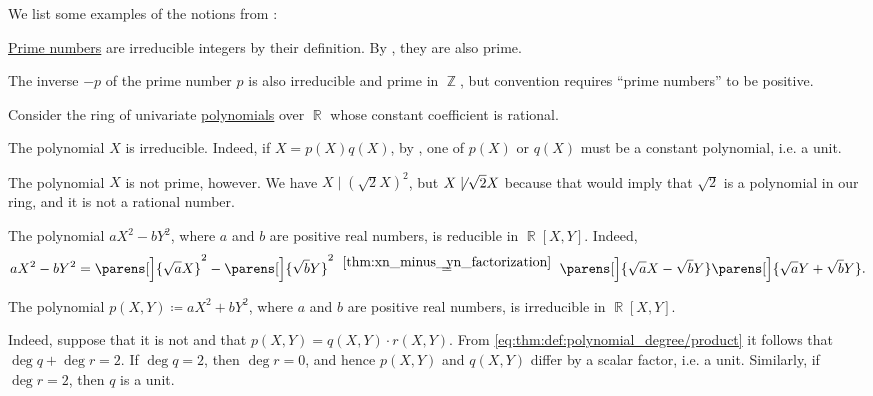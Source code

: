 \begin{example}\label{ex:def:domain_divisibility}
  We list some examples of the notions from :
  \begin{thmenum}
     \hyperref[def:prime_number]{Prime numbers} are irreducible integers by their definition. By , they are also prime.

    The inverse \( -p \) of the prime number \( p \) is also irreducible and prime in \( \BbbZ \), but convention requires \enquote{prime numbers} to be positive.

     Consider the ring of univariate \hyperref[def:polynomial_algebra]{polynomials} over \( \BbbR \) whose constant coefficient is rational.

    The polynomial \( X \) is irreducible. Indeed, if \( X = p(X) q(X) \), by , one of \( p(X) \) or \( q(X) \) must be a constant polynomial, i.e. a unit.

    The polynomial \( X \) is not prime, however. We have \( X \mid (\sqrt 2 X)^2 \), but \( X \not\mid \sqrt 2 X \) because that would imply that \( \sqrt 2 \) is a polynomial in our ring, and it is not a rational number.

     The polynomial \( a X^2 - b Y^2 \), where \( a \) and \( b \) are positive real numbers, is reducible in \( \BbbR[X, Y] \). Indeed,
    \begin{equation*}
      a X^2 - b Y^2
      =
      \parens[\Big]{ \sqrt a X }^2 - \parens[\Big]{ \sqrt b Y }^2
      \reloset {\ref{thm:xn_minus_yn_factorization}} =
      \parens[\Big]{ \sqrt a X - \sqrt b Y } \parens[\Big]{ \sqrt a Y + \sqrt b Y }.
    \end{equation*}

     The polynomial \( p(X, Y) \coloneqq a X^2 + b Y^2 \), where \( a \) and \( b \) are positive real numbers, is irreducible in \( \BbbR[X, Y] \).

    Indeed, suppose that it is not and that \( p(X, Y) = q(X, Y) \cdot r(X, Y) \). From \eqref{eq:thm:def:polynomial_degree/product} it follows that \( \deg q + \deg r = 2 \). If \( \deg q = 2 \), then \( \deg r = 0 \), and hence \( p(X, Y) \) and \( q(X, Y) \) differ by a scalar factor, i.e. a unit. Similarly, if \( \deg r = 2 \), then \( q \) is a unit.


\end{thmenum}
\end{example}

